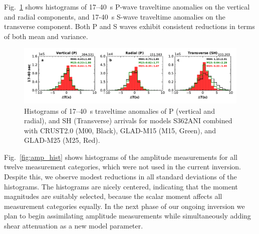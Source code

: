 Fig.~\ref{fig:PS_phase_hist} shows histograms of 17--40~s P-wave traveltime anomalies on the vertical and radial components, and 17-40~s S-wave traveltime anomalies on the transverse component.
Both P and S waves exhibit consistent reductions in terms of both mean and variance. 

\begin{figure}
  \centering
  \includegraphics[width=\textwidth]{ch-GLADM25/figures/dt_histogram_phase.pdf}
  \caption[Histograms of 17--40~s traveltime anomalies of P and SH arrivals]
  {\small{Histograms of 17--40~s traveltime anomalies of P (vertical and radial), and SH (Transverse) arrivals for models S362ANI combined with CRUST2.0 (M00, Black), GLAD-M15 (M15, Green), and GLAD-M25 (M25, Red).
  }}
  \label{fig:PS_phase_hist}
\end{figure}

Fig.~\ref{fig:amp_hist} shows histograms of the amplitude
measurements for all twelve measurement categories,
which were not used in the current inversion.
Despite this,
we observe modest reductions in all standard deviations of the histograms.
The histograms are nicely centered, indicating that the moment magnitudes are
suitably selected, because the scalar moment affects all measurement categories equally.
In the next phase of our ongoing inversion we plan to begin assimilating amplitude measurements while simultaneously adding shear attenuation as a new model parameter.

